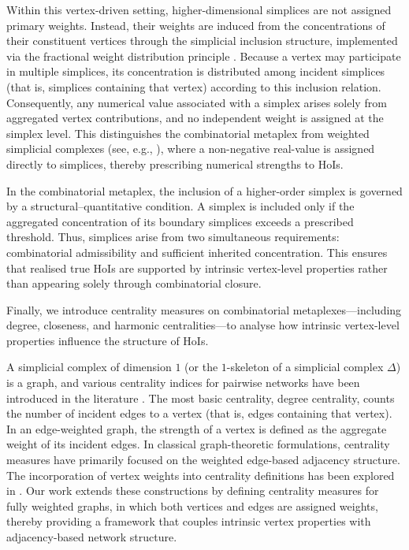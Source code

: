 \documentclass[12pt]{article}
\theoremstyle{normalhead_nobrackets}
\theoremstyle{exampstyle}
\begin{document}
Within this vertex-driven setting, higher-dimensional simplices are not assigned primary weights. Instead, their weights are induced from the concentrations of their constituent vertices through the simplicial inclusion structure, implemented via the fractional weight distribution principle \cite{batagelj2020fractional,perianes2016constructing}. Because a vertex may participate in multiple simplices, its concentration is distributed among incident simplices (that is, simplices containing that vertex) according to this inclusion relation. Consequently, any numerical value associated with a simplex arises solely from aggregated vertex contributions, and no independent weight is assigned at the simplex level. This distinguishes the combinatorial metaplex from weighted simplicial complexes (see, e.g., \cite{sharma2017weighted,carstens2013persistent,baccini2022weighted}), where a non-negative real-value is assigned directly to simplices, thereby prescribing numerical strengths to HoIs.

In the combinatorial metaplex, the inclusion of a higher-order simplex is governed by a structural–quantitative condition. A simplex is included only if the aggregated concentration of its boundary simplices exceeds a prescribed threshold. Thus, simplices arise from two simultaneous requirements: combinatorial admissibility and sufficient inherited concentration. This ensures that realised true HoIs are supported by intrinsic vertex-level properties rather than appearing solely through combinatorial closure.


Finally, we introduce centrality measures on combinatorial metaplexes—including degree, closeness, and harmonic centralities—to analyse how intrinsic vertex-level properties influence the structure of HoIs.

A simplicial complex of dimension $1$ (or the $1$-skeleton of a simplicial complex $\Delta$) is a graph, and various centrality indices for pairwise networks have been introduced in the literature \cite{upadhyay2017network, upadhyay2019network, opsahla2010node, scardoni2012centralities}. The most basic centrality, degree centrality, counts the number of incident edges to a vertex (that is, edges containing that vertex). In an edge-weighted graph, the strength of a vertex is defined as the aggregate weight of its incident edges.  In classical graph-theoretic formulations, centrality measures have primarily focused on the weighted edge-based adjacency structure. The incorporation of vertex weights into centrality definitions has been explored in \cite{abbasi2013hybrid, singh2020node, akanmu2014weighted, kapoor2013weighted}. Our work extends these constructions by defining centrality measures for fully weighted graphs, in which both vertices and edges are assigned weights, thereby providing a framework that couples intrinsic vertex properties with adjacency-based network structure.
 
\end{document}
